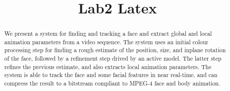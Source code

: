 \documentclass[12pt]{acmart}
\begin{document}
 

\title{Lab2 Latex}

\tableofcontents
\newpage

\maketitle

\begin{abstract}
We present a system for finding and tracking a face and extract global and local animation parameters from a video sequence. The system uses an initial colour processing step for finding a rough estimate of the position, size, and inplane rotation of the face, followed by a refinement step drived by an active model. The latter step refines the previous estimate, and also extracts local animation parame­ters. The system is able to track the face and some facial features in near real-time, and can compress the result to a bitstream compliant to MPEG-4 face and body animation. 
\end{abstract}

\end{document}
